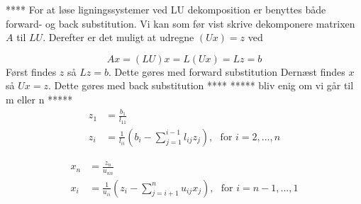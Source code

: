 \documentclass{article}
\begin{document}
****
For at løse ligningssystemer ved LU dekomposition er benyttes både forward- og back substitution. Vi kan som før vist skrive dekomponere matrixen $A$ til $LU$. Derefter er det muligt at udregne $(Ux) = z$ ved 

$$Ax=(LU)x=L(Ux)=Lz=b$$
Først findes $z$ så $Lz=b$. Dette gøres med forward substitution\newline
Dernæst findes $x$ så $Ux=z$. Dette gøres med back substitution
****
\newline\newline
*****
bliv enig om vi går til m eller n
*****
\newline
\begin{align*}
z_1	&= \frac{b_1}{l_{11}}\\
z_i	&= \frac{1}{l_{ii}} \left(b_i - \sum\limits_{j=1}^{i-1} l_{ij} z_j\right), \ \ \ \text{for } i=2, ..., n
\end{align*}

\begin{align*}
x_n	&= \frac{z_n}{u_{nn}}\\
x_i	&= \frac{1}{u_{ii}} \left(z_i - \sum\limits_{j=i+1}^{n} u_{ij} x_j\right), \ \ \ \text{for } i=n-1, ..., 1
\end{align*}




\newpage
\end{document}

